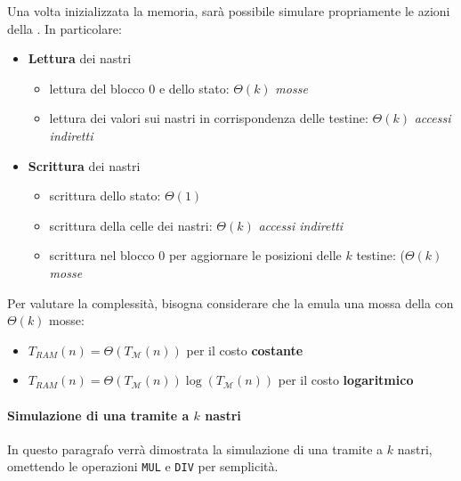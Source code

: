 \documentclass[italian, 10pt]{article}
\begin{document}
Una volta inizializzata la memoria, sarà possibile simulare propriamente le azioni della \TM.
In particolare:

\begin{itemize}
  \item \textbf{Lettura} dei nastri
        \begin{itemize}
          \item lettura del blocco \(0\) e dello stato: \(\Theta(k)\) \textit{mosse}
          \item lettura dei valori sui nastri in corrispondenza delle testine: \(\Theta(k)\) \textit{accessi indiretti}
        \end{itemize}
  \item \textbf{Scrittura} dei nastri
        \begin{itemize}
          \item scrittura dello stato: \(\Theta(1)\)
          \item scrittura della celle dei nastri: \(\Theta(k)\) \textit{accessi indiretti}
          \item scrittura nel blocco \(0\) per aggiornare le posizioni delle \(k\) testine: (\(\Theta(k)\) \textit{mosse}
        \end{itemize}
\end{itemize}

Per valutare la complessità, bisogna considerare che la \RAM emula una mossa della \TM con \(\Theta(k)\) mosse:

\begin{itemize}
  \item \(T_{RAM}(n) = \Theta\left(T_{\mathscr{M}}(n)\right)\) per il costo \textbf{costante}
  \item \(T_{RAM}(n) = \Theta\left(T_{\mathscr{M}}(n)\right) \log\left(T_{\mathscr{M}}(n)\right)\) per il costo \textbf{logaritmico}
\end{itemize}

\paragraph[Simulazione di una \RAM nastri tramite \TM a k nastri]{Simulazione di una \RAM tramite \TM a \(k\) nastri}

In questo paragrafo verrà dimostrata la simulazione di una \RAM tramite \TM a \(k\) nastri, omettendo le operazioni \texttt{MUL} e \texttt{DIV} per semplicità.
\end{document}
